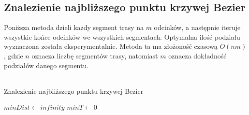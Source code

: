 \subsection{Znalezienie najbliższego punktu krzywej Bezier}
Poniższa metoda dzieli każdy segment trasy na $m$ odcinków, a następnie iteruje wszystkie końce odcinków we wszystkich segmentach. Optymalna ilość podziału wyznaczona została eksperymentalnie. Metoda ta ma złożoność czasową $O(nm)$, gdzie $n$ oznacza liczbę segmentów trasy, natomiast $m$ oznacza dokładność podziałów danego segmentu.
\\\\
\begin{algorithm}[H]
    \caption{Znalezienie najbliższego punktu krzywej Bezier}\label{alg}
    $minDist \gets infinity$\;
    $minT \gets 0$\;
\end{algorithm}
\phantom{.}\\

